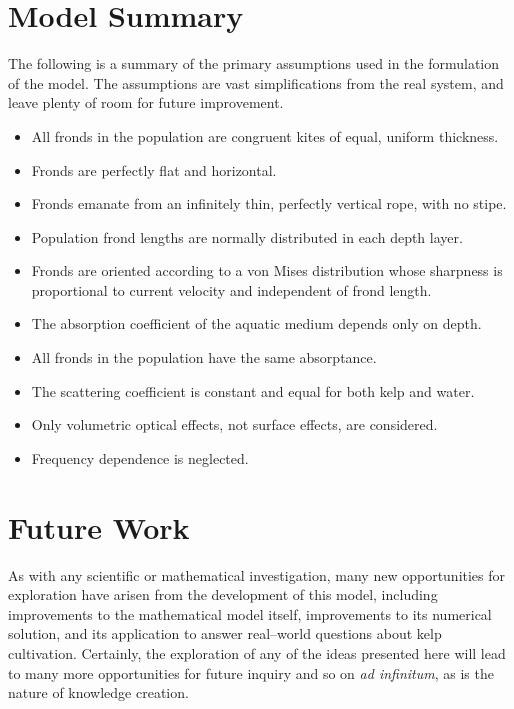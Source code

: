 \section{Model Summary}
The following is a summary of the primary assumptions used in the formulation of the model.
The assumptions are vast simplifications from the real system, and leave plenty of room for future improvement.
\begin{itemize}
  \item All fronds in the population are congruent kites of equal, uniform thickness.
  \item Fronds are perfectly flat and horizontal.
  \item Fronds emanate from an infinitely thin, perfectly vertical rope, with no stipe.
  \item Population frond lengths are normally distributed in each depth layer.
  \item Fronds are oriented according to a von Mises distribution whose sharpness is proportional to current velocity and independent of frond length.
  \item The absorption coefficient of the aquatic medium depends only on depth.
  \item All fronds in the population have the same absorptance.
  \item The scattering coefficient is constant and equal for both kelp and water.
  \item Only volumetric optical effects, not surface effects, are considered.
  \item Frequency dependence is neglected.
\end{itemize}


\section{Future Work}
As with any scientific or mathematical investigation, many new opportunities for exploration have arisen from the development of this model, including improvements to the mathematical model itself, improvements to its numerical solution, and its application to answer real--world questions about kelp cultivation.
Certainly, the exploration of any of the ideas presented here will lead to many more opportunities for future inquiry and so on \textit{ad infinitum}, as is the nature of knowledge creation.
